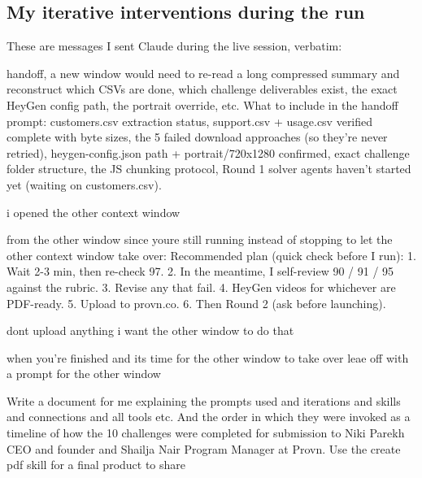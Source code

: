 \documentclass[12pt, letterpaper]{article}
\newenvironment{userquote}{%
    \begin{tcolorbox}[colback=quotebg, colframe=quoteborder,
        title={\textsc{Ariel, in-session}}, fonttitle=\bfseries\small,
        coltitle=quoteborder]
    \itshape
}{%
    \end{tcolorbox}
}
\begin{document}
\subsection{My iterative interventions during the run}

These are messages I sent Claude during the live session, verbatim:

\begin{userquote}
handoff, a new window would need to re-read a long compressed summary and reconstruct which CSVs are done, which challenge deliverables exist, the exact HeyGen config path, the portrait override, etc. What to include in the handoff prompt: customers.csv extraction status, support.csv + usage.csv verified complete with byte sizes, the 5 failed download approaches (so they're never retried), heygen-config.json path + portrait/720x1280 confirmed, exact challenge folder structure, the JS chunking protocol, Round 1 solver agents haven't started yet (waiting on customers.csv).
\end{userquote}

\begin{userquote}
i opened the other context window
\end{userquote}

\begin{userquote}
from the other window since youre still running instead of stopping to let the other context window take over: Recommended plan (quick check before I run): 1. Wait 2-3 min, then re-check 97. 2. In the meantime, I self-review 90 / 91 / 95 against the rubric. 3. Revise any that fail. 4. HeyGen videos for whichever are PDF-ready. 5. Upload to provn.co. 6. Then Round 2 (ask before launching).
\end{userquote}

\begin{userquote}
dont upload anything i want the other window to do that
\end{userquote}

\begin{userquote}
when you're finished and its time for the other window to take over leae off with a prompt for the other window
\end{userquote}

\begin{userquote}
Write a document for me explaining the prompts used and iterations and skills and connections and all tools etc. And the order in which they were invoked as a timeline of how the 10 challenges were completed for submission to Niki Parekh CEO and founder and Shailja Nair Program Manager at Provn. Use the create pdf skill for a final product to share
\end{userquote}
\end{document}
